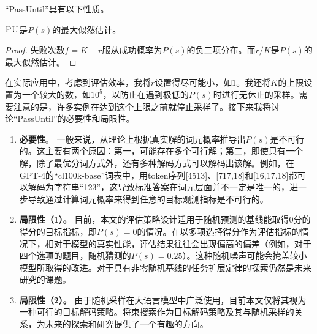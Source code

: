 “PassUntil”具有以下性质。
\begin{theorem}
$\textsc{PU}$是$P(s)$的最大似然估计。
\end{theorem}

\begin{proof}
失败次数$f = K - r$服从成功概率为$P(s)$的负二项分布。而$r/K$是$P(s)$的最大似然估计。
\end{proof}


在实际应用中，考虑到评估效率，我将$r$设置得尽可能小，如$1$。我还将$K$的上限设置为一个较大的数，如$10^5$，以防止在遇到极低的$P(s)$时进行无休止的采样。需要注意的是，许多实例在达到这个上限之前就停止采样了。接下来我将讨论“PassUntil”的必要性和局限性。

\begin{enumerate}
    \item \textbf{必要性}。 一般来说，从理论上根据真实解的词元概率推导出$P(s)$是不可行的。这主要有两个原因：第一，可能存在多个可行解；第二，即使只有一个解，除了最优分词方式外，还有多种解码方式可以解码出该解。例如，在GPT-4的“cl100k-base”词表中，用token序列[4513]、[717,18]和[16,17,18]都可以解码为字符串“123”，这导致标准答案在词元层面并不一定是唯一的，进一步导致通过计算词元概率来得到任意的目标观测指标是不可行的。
    \item \textbf{局限性（1）。} 目前，本文的评估策略设计适用于随机预测的基线能取得0分的得分的目标指标，即$P(s) = 0$的情况。在以多项选择得分作为评估指标的情况下，相对于模型的真实性能，评估结果往往会出现偏高的偏差（例如，对于四个选项的题目，随机猜测的$P(s) = 0.25$）。这种随机噪声可能会掩盖较小模型所取得的改进。对于具有非零随机基线的任务扩展定律的探索仍然是未来研究的课题。
    \item \textbf{局限性（2）。} 由于随机采样在大语言模型中广泛使用，目前本文仅将其视为一种可行的目标解码策略。将束搜索作为目标解码策略及其与随机采样的关系，为未来的探索和研究提供了一个有趣的方向。 
\end{enumerate}


